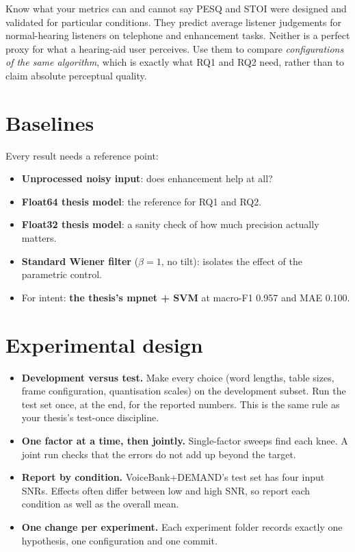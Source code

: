 \begin{conceptbox}{Know what your metrics can and cannot say}
PESQ and STOI were designed and validated for particular conditions. They
predict average listener judgements for normal-hearing listeners on telephone
and enhancement tasks. Neither is a perfect proxy for what a hearing-aid user
perceives. Use them to compare \emph{configurations of the same algorithm}, which
is exactly what RQ1 and RQ2 need, rather than to claim absolute perceptual
quality.
\end{conceptbox}

\section{Baselines}\label{sec:eval:baselines}

Every result needs a reference point:
\begin{itemize}
  \item \textbf{Unprocessed noisy input}: does enhancement help at all?
  \item \textbf{Float64 thesis model}: the reference for RQ1 and RQ2.
  \item \textbf{Float32 thesis model}: a sanity check of how much precision
        actually matters.
  \item \textbf{Standard Wiener filter} ($\beta=1$, no tilt): isolates the
        effect of the parametric control.
  \item For intent: \textbf{the thesis's mpnet + SVM} at macro-F1 0.957 and MAE
        0.100.
\end{itemize}

\section{Experimental design}\label{sec:eval:design}

\begin{itemize}
  \item \textbf{Development versus test.} Make every choice (word lengths, table
        sizes, frame configuration, quantisation scales) on the development
        subset. Run the test set once, at the end, for the reported numbers.
        This is the same rule as your thesis's test-once discipline.
  \item \textbf{One factor at a time, then jointly.} Single-factor sweeps find
        each knee. A joint run checks that the errors do not add up beyond the
        target.
  \item \textbf{Report by condition.} VoiceBank+DEMAND's test set has four input
        SNRs. Effects often differ between low and high SNR, so report each
        condition as well as the overall mean.
  \item \textbf{One change per experiment.} Each experiment folder records
        exactly one hypothesis, one configuration and one commit.
\end{itemize}

